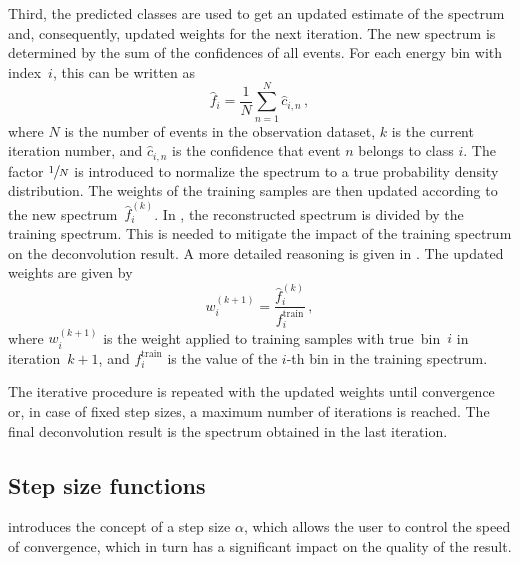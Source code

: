 Third,
the predicted classes are used to
  get an updated estimate of the spectrum
  and,
    consequently,
  updated weights for the next iteration.
%
The new spectrum is determined by the sum of the confidences of all events.
For each energy bin with index~$i$,
this can be written as
\begin{equation}
  \hat f_i = \frac{1}{N} \sum_{n=1}^N \hat c_{i,n} \, ,
\end{equation}
where $N$ is the number of events in the observation dataset,
$k$ is the current iteration number, %
and $\hat c_{i,n}$ is the confidence
  that event $n$ belongs to class $i$.
The factor $\sfrac{1}{N}$ is introduced to normalize the spectrum
to a true probability density distribution.
%
The weights of the training samples are then updated according to the new spectrum~$\hat f_i^{(k)}$. %
In \dseaplus{}, the reconstructed spectrum is divided by the training spectrum. %
This is needed to mitigate the impact of the training spectrum on the deconvolution result.
A more detailed reasoning is given in \cite{dsea_mirko}.
The updated weights are given by
\begin{equation}
  \label{eqn:dsea:weighting}
  w_i^{(k+1)} = \frac{\hat f_i^{(k)}}{f_i^\text{train}} \, ,
\end{equation}
where $w_i^{(k+1)}$ is the weight applied to training samples with true~bin~$i$ in iteration~$k+1$, %
and $f_i^\text{train}$ is
  the value of the $i$-th bin in
  the training spectrum.


The iterative procedure is repeated
  with the updated weights
until
  convergence
  or,
    in case of fixed step sizes,
  a maximum number of iterations
is reached.
%
%
The final deconvolution result is the spectrum obtained in the last iteration.



\subsection{Step size functions} \label{sec:dsea:dsea:stepsize}
\dseaplus{} introduces the concept of a step size $\alpha$,
which allows the user to control the speed of convergence,
which in turn has a significant impact on the quality of the result.

